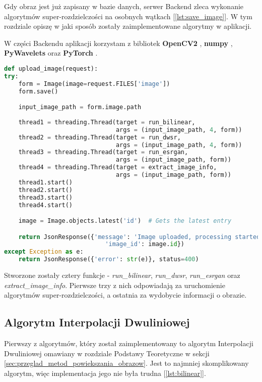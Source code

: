 Gdy obraz jest już zapisany w bazie danych, serwer Backend zleca wykonanie algorytmów super-rozdzielczości na osobnych wątkach [\ref{lst:save_image}]. W tym rozdziale opiszę w jaki sposób zostały zaimplementowane algorytmy w aplikacji.

W części Backendu aplikacji korzystam z bibliotek \textbf{OpenCV2} \cite{opencv}, \textbf{numpy} \cite{numpy}, \textbf{PyWavelets} \cite{pywavelets} oraz \textbf{PyTorch} \cite{pytorch}.

\newpage
\begin{lstlisting}[language=Python, caption=Obsługa zapisu i przetwarzania obrazów., label={lst:save_image}]
def upload_image(request):
try:
    form = Image(image=request.FILES['image'])
    form.save()

    input_image_path = form.image.path
    
    thread1 = threading.Thread(target = run_bilinear, 
                               args = (input_image_path, 4, form))
    thread2 = threading.Thread(target = run_dwsr, 
                               args = (input_image_path, 4, form))
    thread3 = threading.Thread(target = run_esrgan, 
                               args = (input_image_path, form))
    thread4 = threading.Thread(target = extract_image_info, 
                               args = (input_image_path, form))
    thread1.start()
    thread2.start()
    thread3.start()
    thread4.start()

    image = Image.objects.latest('id')  # Gets the latest entry

    return JsonResponse({'message': 'Image uploaded, processing started', 
                            'image_id': image.id})
except Exception as e:
    return JsonResponse({'error': str(e)}, status=400)
\end{lstlisting}

Stworzone zostały cztery funkcje - \textit{run\_bilinear}, \textit{run\_dwsr}, \textit{run\_esrgan} oraz\\ \textit{extract\_image\_info}. Pierwsze trzy z nich odpowiadają za uruchomienie algorytmów super-rozdzielczości, a ostatnia za wydobycie informacji o obrazie.




\subsection*{Algorytm Interpolacji Dwuliniowej}

Pierwszy z algorytmów, który został zaimplementowany to algorytm Interpolacji Dwuliniowej omawiany w rozdziale Podstawy Teoretyczne w sekcji \ref{sec:przeglad_metod_powiekszania_obrazow}.
Jest to najmniej skomplikowany algorytm, więc implementacja jego nie była trudna [\ref{lst:bilinear}].

